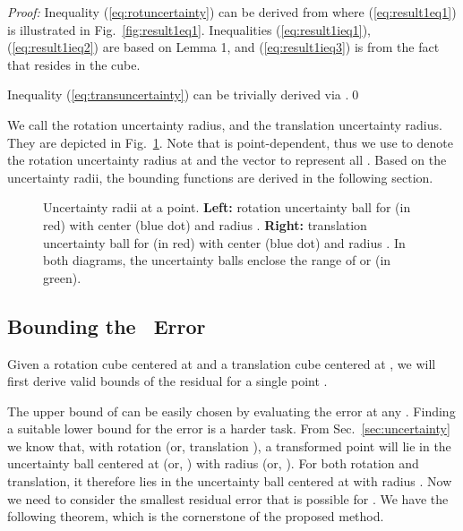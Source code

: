 \documentclass[10pt,journal,cspaper,compsoc]{IEEEtran}
\begin{document}
\noindent \emph{Proof:} Inequality (\ref{eq:rotuncertainty}) can be derived from
{}where (\ref{eq:result1eq1}) is illustrated in Fig.~\ref{fig:result1eq1}. Inequalities (\ref{eq:result1ieq1}), (\ref{eq:result1ieq2}) are based on Lemma 1, and (\ref{eq:result1ieq3}) is from the fact that  resides in the cube.

Inequality (\ref{eq:transuncertainty}) can be trivially derived via \mbox{}.\qed
\vspace{3pt}


We call  the rotation uncertainty radius, and  the translation uncertainty radius. They are depicted in Fig.~\ref{fig:uncertainty}. Note that  is point-dependent, thus we use  to denote the rotation uncertainty radius at  and the vector  to represent all .
Based on the uncertainty radii, the bounding functions are derived in the following section.

\begin{figure}[!t]
\begin{center}
\vspace{-2pt}
\caption{Uncertainty radii at a point.  \textbf{Left:} rotation uncertainty ball for  (in red) with center  (blue dot) and radius . \textbf{Right:} translation uncertainty ball for  (in red) with center  (blue dot) and radius .  In both diagrams, the uncertainty balls enclose the range of  or  (in green).
\label{fig:uncertainty}}
\end{center}
\end{figure}

\subsection{Bounding the \boldmath\unboldmath\ Error}\label{sec:errorbound}
Given a rotation cube  centered at  and a translation cube  centered at , we will first derive valid bounds of the residual  for a single point .

The upper bound of  can be easily chosen by evaluating the error at any . Finding a suitable lower bound for the  error is a harder task. From Sec.~\ref{sec:uncertainty} we know that, with rotation  (or, translation ), a transformed point  will lie in the uncertainty ball centered at  (or, ) with radius  (or, ). For both rotation and translation, it therefore lies in the uncertainty ball centered at  with radius . Now we need to consider the smallest residual error that is possible for . We have the following theorem, which is the cornerstone of the proposed method.
\end{document}

